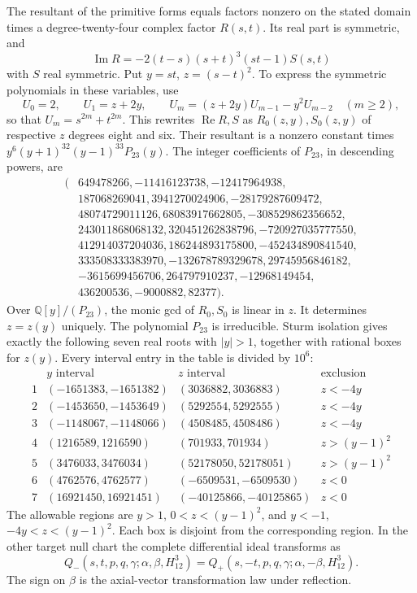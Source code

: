\documentclass[11pt,a4paper]{article}
\numberwithin{equation}{section}
\theoremstyle{plain}
\theoremstyle{definition}
\theoremstyle{remark}
\begin{document}
The resultant of the primitive forms equals factors nonzero on the stated domain times
a degree-twenty-four complex factor $R(s,t)$.  Its real part is symmetric,
and
\[
 \operatorname{Im}R=-2(t-s)(s+t)^3(st-1)S(s,t)
\]
with $S$ real symmetric. Put $y=st$, $z=(s-t)^2$.
To express the symmetric polynomials in these variables, use
\[
 U_0=2,\qquad U_1=z+2y,\qquad
 U_m=(z+2y)U_{m-1}-y^2U_{m-2}\quad(m\ge2),
\]
so that $U_m=s^{2m}+t^{2m}$. This rewrites
$\operatorname{Re}R,S$ as $R_0(z,y),S_0(z,y)$ of respective
$z$ degrees eight and six.  Their resultant is a nonzero constant times
$y^6(y+1)^{32}(y-1)^{33}P_{23}(y)$.
The integer coefficients of $P_{23}$, in descending powers, are
\begin{align*}
(&649478266,-11416123738,-12417964938,\\
 &187068269041,3941270024906,-28179287609472,\\
 &48074729011126,68083917662805,-308529862356652,\\
 &243011868068132,320451262838796,-720927035777550,\\
 &412914037204036,186244893175800,-452434890841540,\\
 &333508333383970,-132678789329678,29745956846182,\\
 &-3615699456706,264797910237,-12968149454,\\
 &436200536,-9000882,82377).
\end{align*}
Over $\mathbb Q[y]/(P_{23})$, the monic gcd of $R_0,S_0$ is linear in $z$.
It determines $z=z(y)$ uniquely. The polynomial
$P_{23}$ is irreducible.  Sturm isolation gives exactly the following
seven real roots with $|y|>1$, together with rational boxes for $z(y)$.
Every interval entry in the table is divided by $10^6$:
\[
 \begin{array}{c|c|c|l}
 &y\text{ interval}&z\text{ interval}&\text{exclusion}\\ \hline
1&(-1651383,-1651382)&(3036882,3036883)&z<-4y\\
2&(-1453650,-1453649)&(5292554,5292555)&z<-4y\\
3&(-1148067,-1148066)&(4508485,4508486)&z<-4y\\
4&(1216589,1216590)&(701933,701934)&z>(y-1)^2\\
5&(3476033,3476034)&(52178050,52178051)&z>(y-1)^2\\
6&(4762576,4762577)&(-6509531,-6509530)&z<0\\
7&(16921450,16921451)&(-40125866,-40125865)&z<0
\end{array}
\]
The allowable regions are $y>1$, $0<z<(y-1)^2$, and
$y<-1$, $-4y<z<(y-1)^2$.  Each box is disjoint from the corresponding
region.    In the other target null chart the
complete differential ideal transforms as
\[
 Q_-(s,t,p,q,\gamma;\alpha,\beta,H_{12}^3)
   =Q_+(s,-t,p,q,\gamma;\alpha,-\beta,H_{12}^3).
\]
The sign on $\beta$ is the axial-vector transformation law under reflection.
\end{document}
